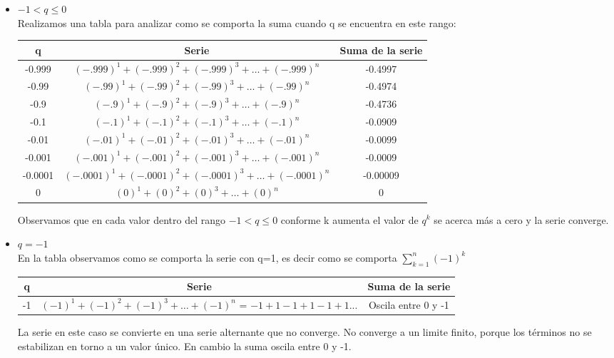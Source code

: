 \documentclass[12pt]{article}
\begin{document}
\begin{enumerate}
\begin{itemize}
    \item $-1< q \leq 0$ \\
    Realizamos una tabla para analizar como se comporta la suma cuando q se encuentra en este rango:\\
          \begin{table} [H]
            \begin{center}
                \begin{tabular}{| c | c | c |}\\ \hline
                    q &     Serie & Suma de la serie  \\ \hline
                    -0.999 &  $(-.999)^1 + (-.999)^2 + (-.999)^3 +\ldots+(-.999)^n$ &  -0.4997   \\ \hline
                    -0.99 &  $(-.99)^1 + (-.99)^2 + (-.99)^3 +\ldots+(-.99)^n$ &    -0.4974\\ \hline
                    -0.9& $(-.9)^1 + (-.9)^2 + (-.9)^3 +\ldots+(-.9)^n$ &  -0.4736    \\ \hline
                    -0.1 & $(-.1)^1 + (-.1)^2 + (-.1)^3 +\ldots+(-.1)^n$  &  -0.0909  \\ \hline
                    -0.01& $(-.01)^1 + (-.01)^2 + (-.01)^3 +\ldots+(-.01)^n$ &   -0.0099 \\ \hline
                    -0.001& $(-.001)^1 + (-.001)^2 + (-.001)^3 +\ldots+(-.001)^n$ &   -0.0009  \\ \hline
                    -0.0001 & $(-.0001)^1 + (-.0001)^2 + (-.0001)^3 +\ldots+(-.0001)^n$ &  -0.00009   \\ \hline
                    0 & $(0)^1 + (0)^2 + (0)^3 +\ldots+(0)^n$& 0    \\ \hline
                \end{tabular}

                \label{tab:datos}
            \end{center}
          \end{table}
Observamos que en cada valor dentro del rango $-1<q\leq 0$ conforme k aumenta el valor de $q^k$ se acerca más a cero y la serie converge.

    
    


    
    \item $q=-1$\\
    En la tabla observamos como se comporta la serie con q=1, es decir como se comporta $\sum_{k=1}^{n} (-1)^k $
    \begin{table} [H]
    \centering
\begin{tabular}{| c | c | c |}
\hline
q &     Serie & Suma de la serie  \\ \hline
 -1 & $(-1)^1 + (-1)^2 + (-1)^3 +\ldots+(-1)^n$ = $-1+1-1+1-1+1...$ & Oscila entre 0 y -1  \\ \hline
\end{tabular}
\label{tab:datos}
\end{table}
La serie en este caso se convierte en una serie alternante que no converge. No converge a un limite finito, porque los términos no se estabilizan en torno a un valor único. En cambio la suma oscila entre 0 y -1.



\end{itemize}
\end{enumerate}
\end{document}
